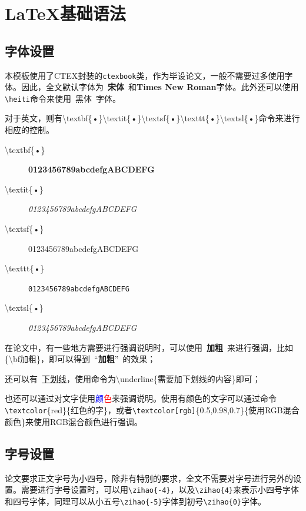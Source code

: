 \chapter{\label{chapter-basic}\LaTeX{}基础语法}
\section{字体设置}
本模板使用了CTEX封装的\texttt{ctexbook}类，作为毕设论文，一般不需要过多使用字体。因此，全文默认字体为~{\bf 宋体}~和{\bf Times New Roman}字体。此外还可以使用\texttt{\textbackslash heiti}命令来使用~{\heiti 黑体}~字体。

对于英文，则有\textbackslash textbf\{•\}\quad\textbackslash textit\{•\}\quad\textbackslash textsf\{•\}\quad\textbackslash texttt\{•\}\quad\textbackslash textsl\{•\}命令来进行相应的控制。

\begin{description}
    \item[\textbackslash textbf\{•\}] \textbf{0123456789abcdefgABCDEFG}
    \item[\textbackslash textit\{•\}] \textit{0123456789abcdefgABCDEFG}
    \item[\textbackslash textsf\{•\}] \textsf{0123456789abcdefgABCDEFG}
    \item[\textbackslash texttt\{•\}] \texttt{0123456789abcdefgABCDEFG}
    \item[\textbackslash textsl\{•\}] \textsl{0123456789abcdefgABCDEFG}
\end{description}
在论文中，有一些地方需要进行强调说明时，可以使用~{\bf 加粗}~来进行强调，比如\{\textbackslash bf加粗\}，即可以得到~“{\bf 加粗}”~的效果；

还可以有~\underline{下划线}，使用命令为\textbackslash underline\{需要加下划线的内容\}即可；

也还可以通过对文字使用\textcolor{blue}{颜}\textcolor{red}{色}来强调说明。使用\textcolor[rgb]{0.5,0.95,0.96}{有颜色的文字}可以通过命令\texttt{\textbackslash textcolor}\{red\}\{红色的字\}，或者\texttt{\textbackslash textcolor[rgb]}\{0.5,0.98,0.7\}\{使用RGB混合颜色\}来\textcolor[rgb]{0.5,0.98,0.7}{使用RGB混合颜色}进行强调。

\section{字号设置}
论文要求正文字号为小四号，除非有特别的要求，全文不需要对字号进行另外的设置。需要进行字号设置时，可以用\texttt{\textbackslash zihao\{-4\}}，以及\texttt{\textbackslash zihao\{4\}}来表示小四号字体和四号字体，同理可以从小五号\texttt{\textbackslash zihao\{-5\}}字体到初号\texttt{\textbackslash zihao\{0\}}字体。

